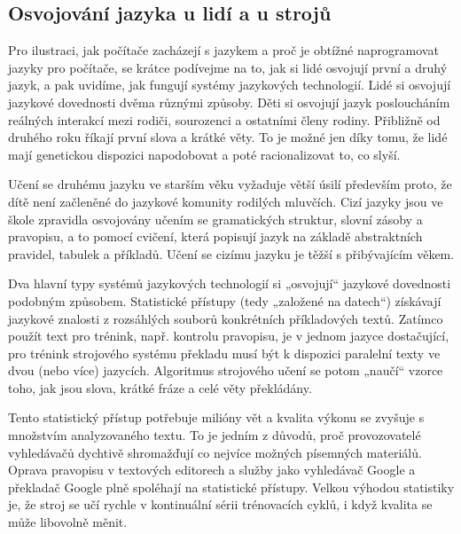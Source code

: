\begin{multicols}{2}
\subsection{Osvojování jazyka u lidí a u strojů}

Pro ilustraci, jak počítače zacházejí s jazykem a proč je obtížné naprogramovat jazyky pro počítače, se krátce podívejme na to, jak si lidé osvojují první a druhý jazyk, a pak uvidíme, jak fungují systémy jazykových technologií.
Lidé si osvojují jazykové dovednosti dvěma různými způsoby. Děti si osvojují jazyk posloucháním reálných interakcí mezi rodiči, sourozenci a ostatními členy rodiny. Přibližně od druhého roku říkají první slova a krátké věty. To je možné jen díky tomu, že lidé mají genetickou dispozici napodobovat a poté racionalizovat to, co slyší.

Učení se druhému jazyku ve starším věku vyžaduje větší úsilí především proto, že dítě není začleněné do jazykové komunity rodilých mluvčích. Cizí jazyky jsou ve škole zpravidla osvojovány učením se gramatických struktur, slovní zásoby a pravopisu, a to pomocí cvičení, která popisují jazyk na základě abstraktních pravidel, tabulek a příkladů. Učení se cizímu jazyku je těžší s přibývajícím věkem.


Dva hlavní typy systémů jazykových technologií si „osvojují“ jazykové dovednosti podobným způsobem. Statistické přístupy (tedy „založené na datech“) získávají jazykové znalosti z rozsáhlých souborů konkrétních příkladových textů. Zatímco použít text pro trénink, např. kontrolu pravopisu, je v jednom jazyce dostačující, pro trénink strojového systému překladu musí být k dispozici paralelní texty ve dvou (nebo více) jazycích. Algoritmus strojového učení se potom „naučí“ vzorce toho, jak jsou slova, krátké fráze a celé věty překládány.

Tento statistický přístup potřebuje milióny vět a kvalita výkonu se zvyšuje s množstvím analyzovaného textu. To je jedním z důvodů, proč provozovatelé vyhledávačů dychtivě shromažďují co nejvíce možných písemných materiálů. Oprava pravopisu v textových editorech a služby jako vyhledávač Google a překladač Google plně spoléhají na statistické přístupy. Velkou výhodou statistiky je, že stroj se učí rychle v kontinuální sérii trénovacích cyklů, i když kvalita se může libovolně měnit.


\end{multicols}
